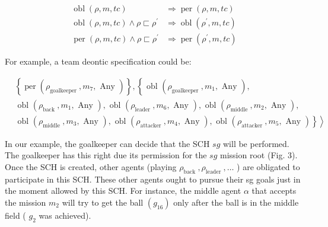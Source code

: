 \documentclass[10pt]{article}
\begin{document}
$$
\begin{aligned}
\operatorname{obl}(\rho, m, t c) & \Rightarrow \operatorname{per}(\rho, m, t c) \\
\operatorname{obl}(\rho, m, t c) \wedge \rho \sqsubset \rho^{\prime} & \Rightarrow \operatorname{obl}\left(\rho^{\prime}, m, t c\right) \\
\operatorname{per}(\rho, m, t c) \wedge \rho \sqsubset \rho^{\prime} & \Rightarrow \operatorname{per}\left(\rho^{\prime}, m, t c\right)
\end{aligned}
$$

For example, a team deontic specification could be:

$$
\begin{aligned}
& \left\{\operatorname{per}\left(\rho_{\text {goalkeeper }}, m_{7}, \text { Any }\right)\right\},\left\{\text { obl }\left(\rho_{\text {goalkeeper }}, m_{1}, \text { Any }\right),\right. \\
& \text { obl }\left(\rho_{\text {back }}, m_{1}, \text { Any }\right), \text { obl }\left(\rho_{\text {leader }}, m_{6}, \text { Any }\right), \text { obl }\left(\rho_{\text {middle }}, m_{2}, \text { Any }\right), \\
& \text { obl } \left.\left.\left(\rho_{\text {middle }}, m_{3}, \text { Any }\right), \text { obl }\left(\rho_{\text {attacker }}, m_{4}, \text { Any }\right), \text { obl }\left(\rho_{\text {attacker }}, m_{5}, \text { Any }\right)\right\}\right\rangle
\end{aligned}
$$

In our example, the goalkeeper can decide that the SCH $s g$ will be performed. The goalkeeper has this right due its permission for the $s g$ mission root (Fig. 3). Once the SCH is created, other agents (playing $\rho_{\text {back }}, \rho_{\text {leader }}, \ldots$ ) are obligated to participate in this SCH. These other agents ought to pursue their sg goals just in the moment allowed by this SCH. For instance, the middle agent $\alpha$ that accepts the mission $m_{2}$ will try to get the ball $\left(g_{16}\right)$ only after the ball is in the middle field ( $g_{2}$ was achieved).
\end{document}
